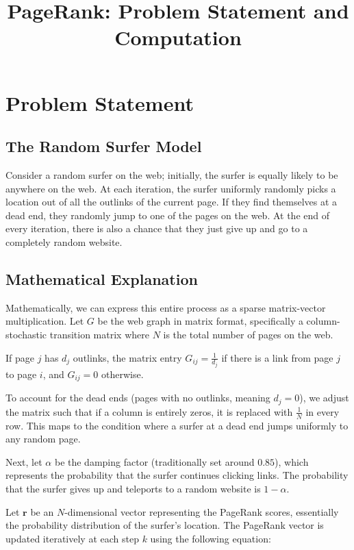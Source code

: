 \documentclass[11pt, a4paper]{article}
\title{PageRank: Problem Statement and Computation}
\author{}
\date{}
\begin{document}
\maketitle

\section{Problem Statement}

\subsection{The Random Surfer Model}
Consider a random surfer on the web; initially, the surfer is equally likely to be anywhere on the web. At each iteration, the surfer uniformly randomly picks a location out of all the outlinks of the current page. If they find themselves at a dead end, they randomly jump to one of the pages on the web. At the end of every iteration, there is also a chance that they just give up and go to a completely random website.

\subsection{Mathematical Explanation}
Mathematically, we can express this entire process as a sparse matrix-vector multiplication. Let $G$ be the web graph in matrix format, specifically a column-stochastic transition matrix where $N$ is the total number of pages on the web.

If page $j$ has $d_j$ outlinks, the matrix entry $G_{ij} = \frac{1}{d_j}$ if there is a link from page $j$ to page $i$, and $G_{ij} = 0$ otherwise.

To account for the dead ends (pages with no outlinks, meaning $d_j = 0$), we adjust the matrix such that if a column is entirely zeros, it is replaced with $\frac{1}{N}$ in every row. This maps to the condition where a surfer at a dead end jumps uniformly to any random page.

Next, let $\alpha$ be the damping factor (traditionally set around $0.85$), which represents the probability that the surfer continues clicking links. The probability that the surfer gives up and teleports to a random website is $1 - \alpha$.

Let $\mathbf{r}$ be an $N$-dimensional vector representing the PageRank scores, essentially the probability distribution of the surfer's location. The PageRank vector is updated iteratively at each step $k$ using the following equation:
\end{document}
